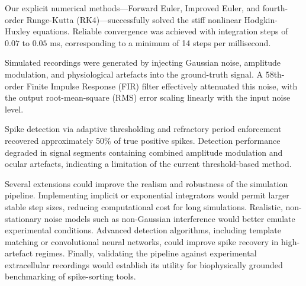 Our explicit numerical methods—Forward Euler, Improved Euler, and fourth-order Runge-Kutta (RK4)—successfully solved the stiff nonlinear Hodgkin-Huxley equations.
Reliable convergence was achieved with integration steps of $0.07$ to $0.05$ ms, corresponding to a minimum of 14 steps per millisecond.

Simulated recordings were generated by injecting Gaussian noise, amplitude modulation, and physiological artefacts into the ground-truth signal.
A 58th-order Finite Impulse Response (FIR) filter effectively attenuated this noise, with the output root-mean-square (RMS) error scaling linearly with the input noise level.

Spike detection via adaptive thresholding and refractory period enforcement recovered approximately 50\% of true positive spikes.
Detection performance degraded in signal segments containing combined amplitude modulation and ocular artefacts, indicating a limitation of the current threshold-based method.

Several extensions could improve the realism and robustness of the simulation pipeline.
Implementing implicit or exponential integrators would permit larger stable step sizes, reducing computational cost for long simulations.
Realistic, non-stationary noise models such as non-Gaussian interference would better emulate experimental conditions.
Advanced detection algorithms, including template matching or convolutional neural networks, could improve spike recovery in high-artefact regimes.
Finally, validating the pipeline against experimental extracellular recordings would establish its utility for biophysically grounded benchmarking of spike-sorting tools.